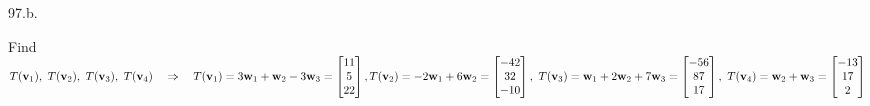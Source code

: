 \documentclass[12pt]{book}
\begin{document}
\begin{CJK}{UTF8}{bsmi}
97.b. \begin{minipage}[t]{\dimexpr\linewidth-2em}
Find $T(\textbf{v}_1),\ T(\textbf{v}_2),\ T(\textbf{v}_3),\ T(\textbf{v}_4)\quad\Rightarrow\quad
T(\textbf{v}_1)=3\textbf{w}_1+\textbf{w}_2-3\textbf{w}_3=\begin{bmatrix}
11\\5\\22
\end{bmatrix},\\ 
T(\textbf{v}_2)=-2\textbf{w}_1+6\textbf{w}_2=\begin{bmatrix}
-42\\32\\-10
\end{bmatrix},\ 
T(\textbf{v}_3)=\textbf{w}_1+2\textbf{w}_2+7\textbf{w}_3=\begin{bmatrix}
-56\\87\\17
\end{bmatrix},\ 
T(\textbf{v}_4)=\textbf{w}_2+\textbf{w}_3=\begin{bmatrix}
-13\\17\\2
\end{bmatrix}$
\end{minipage}\\


\end{CJK}
\end{document}
